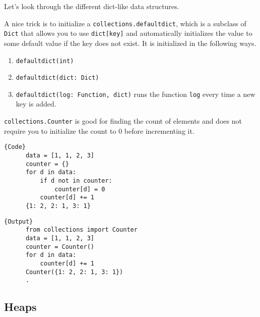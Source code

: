   Let's look through the different dict-like data structures. 

  \begin{definition}[Defaultdict]
    A nice trick is to initialize a \texttt{collections.defaultdict}, which is a subclass of \texttt{Dict} that allows you to use \texttt{dict[key]} and automatically initializes the value to some default value if the key does not exist. It is initialized in the following ways. 
    \begin{enumerate}
      \item \texttt{defaultdict(int)} 
      \item \texttt{defaultdict(dict: Dict)} 
      \item \texttt{defaultdict(log: Function, dict)} runs the function \texttt{log} every time a new key is added. 
    \end{enumerate}
  \end{definition}

  \begin{definition}[Counter]
    \texttt{collections.Counter} is good for finding the count of elements and does not require you to initialize the count to $0$ before incrementing it. 

    \noindent\begin{minipage}{.5\textwidth}
    \begin{lstlisting}[]{Code}
      data = [1, 1, 2, 3] 
      counter = {} 
      for d in data: 
          if d not in counter: 
              counter[d] = 0 
          counter[d] += 1
      {1: 2, 2: 1, 3: 1}
    \end{lstlisting}
    \end{minipage}
    \hfill
    \begin{minipage}{.49\textwidth}
    \begin{lstlisting}[]{Output}
      from collections import Counter
      data = [1, 1, 2, 3] 
      counter = Counter() 
      for d in data: 
          counter[d] += 1 
      Counter({1: 2, 2: 1, 3: 1})
      .
    \end{lstlisting}
    \end{minipage}
  \end{definition}

\subsection{Heaps}

